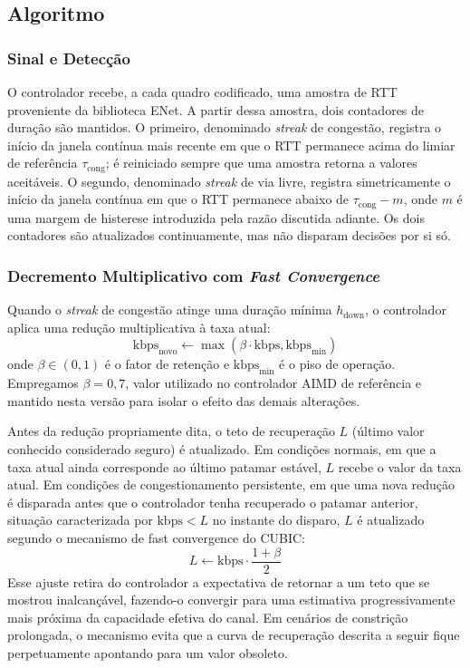 \subsection{Algoritmo}

\subsubsection{Sinal e Detecção}

O controlador recebe, a cada quadro codificado, uma amostra de
RTT proveniente da biblioteca ENet. A partir dessa amostra, dois
contadores de duração são mantidos. O primeiro, denominado
\emph{streak} de congestão, registra o início da janela contínua
mais recente em que o RTT permanece acima do limiar de
referência $\tau_{\text{cong}}$; é reiniciado sempre que uma
amostra retorna a valores aceitáveis. O segundo, denominado
\emph{streak} de via livre, registra simetricamente o início da
janela contínua em que o RTT permanece abaixo de
$\tau_{\text{cong}} - m$, onde $m$ é uma margem de histerese
introduzida pela razão discutida adiante. Os dois contadores são
atualizados continuamente, mas não disparam decisões por si só.

\subsubsection{Decremento Multiplicativo com \emph{Fast Convergence}}

Quando o \emph{streak} de congestão atinge uma duração mínima
$h_{\text{down}}$, o controlador aplica uma redução
multiplicativa à taxa atual:
\begin{equation}
  \text{kbps}_{\text{novo}} \gets \max\!\left( \beta \cdot \text{kbps}, \text{kbps}_{\min} \right)
  \label{eq:decrease}
\end{equation}
onde $\beta \in (0,1)$ é o fator de retenção e
$\text{kbps}_{\min}$ é o piso de operação. Empregamos $\beta = 0{,}7$,
valor utilizado no controlador AIMD de referência e mantido
nesta versão para isolar o efeito das demais alterações.

Antes da redução propriamente dita, o teto de recuperação
$L$ (último valor conhecido considerado seguro) é atualizado.
Em condições normais, em que a taxa atual ainda corresponde ao
último patamar estável, $L$ recebe o valor da taxa atual. Em
condições de congestionamento persistente, em que uma nova
redução é disparada antes que o controlador tenha recuperado o
patamar anterior, situação caracterizada por
$\text{kbps} < L$ no instante do disparo, $L$ é atualizado
segundo o mecanismo de fast convergence do
CUBIC:
\begin{equation}
  L \gets \text{kbps} \cdot \frac{1 + \beta}{2}
  \label{eq:fastconv}
\end{equation}
Esse ajuste retira do controlador a expectativa de retornar a
um teto que se mostrou inalcançável, fazendo-o convergir para
uma estimativa progressivamente mais próxima da capacidade
efetiva do canal. Em cenários de constrição prolongada, o
mecanismo evita que a curva de recuperação descrita a seguir
fique perpetuamente apontando para um valor obsoleto.


